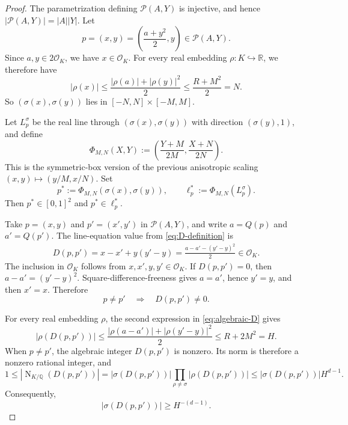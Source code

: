 \documentclass[11pt,reqno]{amsart}
\theoremstyle{definition}
\theoremstyle{remark}
\newcommand{\R}{\mathbb{R}}
\newcommand{\Q}{\mathbb{Q}}
\newcommand{\OK}{\mathcal{O}_K}
\newcommand{\Norm}{\operatorname{N}}
\begin{document}
\begin{proof}
The parametrization defining $\mathcal P(A,Y)$ is injective, and hence
$|\mathcal P(A,Y)|=|A||Y|$. Let
\[
        p=(x,y)
        =\left(\frac{a+y^2}{2},y\right)
        \in\mathcal P(A,Y).
\]
Since $a,y\in2\OK$, we have $x\in\OK$. For every real embedding $\rho:K\hookrightarrow\R$, we therefore have
\[
        |\rho(x)|
        \le\frac{|\rho(a)|+|\rho(y)|^2}{2}
        \le\frac{R+M^2}{2}
        =N.
\]
So $(\sigma(x),\sigma(y))$ lies in
$[-N,N]\times[-M,M]$.

Let $L_p^\sigma$ be the real line through
$(\sigma(x),\sigma(y))$ with direction $(\sigma(y),1)$, and define
\begin{equation}
\label{eq:Phi-MN}
        \Phi_{M,N}(X,Y)
        :=\left(\frac{Y+M}{2M},\frac{X+N}{2N}\right).
\end{equation}
This is the symmetric-box version of the previous anisotropic scaling
$(x,y)\mapsto(y/M,x/N)$.  Set
\begin{equation}
\label{eq:scaled-pairs}
        p^*:=\Phi_{M,N}(\sigma(x),\sigma(y)),
        \qquad
        \ell_p^*:=\Phi_{M,N}(L_p^\sigma).
\end{equation}
Then $p^*\in[0,1]^2$ and $p^*\in\ell_p^*$.

Take $p=(x,y)$ and $p'=(x',y')$ in $\mathcal P(A,Y)$, and write
$a=Q(p)$ and $a'=Q(p')$.  The line-equation value from
\eqref{eq:D-definition} is
\begin{equation}
\label{eq:algebraic-D}
\begin{aligned}
        D(p,p') =x-x'+y(y'-y)=\frac{a-a'-(y'-y)^2}{2}\in\OK.
\end{aligned}
\end{equation}
The inclusion in $\OK$ follows from $x,x',y,y'\in\OK$.  If
$D(p,p')=0$, then $a-a'=(y'-y)^2$. Square-difference-freeness gives $a=a'$, hence $y'=y$, and then
$x'=x$.  Therefore
\begin{equation}
\label{eq:D-nonzero}
        p\ne p'
        \quad\Longrightarrow\quad
        D(p,p')\ne0.
\end{equation}

For every real embedding $\rho$, the second expression in
\eqref{eq:algebraic-D} gives
\[
        |\rho(D(p,p'))|
        \le
        \frac{|\rho(a-a')|+|\rho(y'-y)|^2}{2}
        \le R+2M^2
        =H.
\]
When $p\ne p'$, the algebraic integer $D(p,p')$ is nonzero.  Its norm is
therefore a nonzero rational integer, and
\[
        1
        \le|\Norm_{K/\Q}(D(p,p'))|
        =|\sigma(D(p,p'))|
         \prod_{\rho\ne\sigma}|\rho(D(p,p'))|
        \le|\sigma(D(p,p'))|H^{d-1}.
\]
Consequently,
\begin{equation}
\label{eq:D-lower}
        |\sigma(D(p,p'))|\ge H^{-(d-1)}.
\end{equation}


\end{proof}
\end{document}

